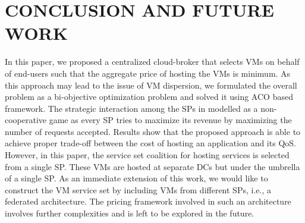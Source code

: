 \documentclass[conference]{IEEEtran}
\newcommand\tab[1][0.8cm]{\hspace*{#1}}
\begin{document}
\section{CONCLUSION AND FUTURE WORK}
\tab In this paper, we proposed a centralized cloud-broker that
selects VMs on behalf of end-users such that the aggregate
price of hosting the VMs is minimum. As this approach may
lead to the issue of VM dispersion, we formulated the overall
problem as a bi-objective optimization problem and solved it
using ACO based framework. The strategic interaction among
the SPs in modelled as a non-cooperative game as every SP
tries to maximize its revenue by maximizing the number of
requests accepted.
\newline
\tab Results show that the proposed approach is
able to achieve proper trade-off between the cost of hosting
an application and its QoS. However, in this paper, the service
set coalition for hosting services is selected from a single SP.
These VMs are hosted at separate DCs but under the umbrella
of a single SP. As an immediate extension of this work, we
would like to construct the VM service set by including VMs
from different SPs, i.e., a federated architecture. The pricing
framework involved in such an architecture involves further
complexities and is left to be explored in the future.
\newline
\newline
\end{document}

